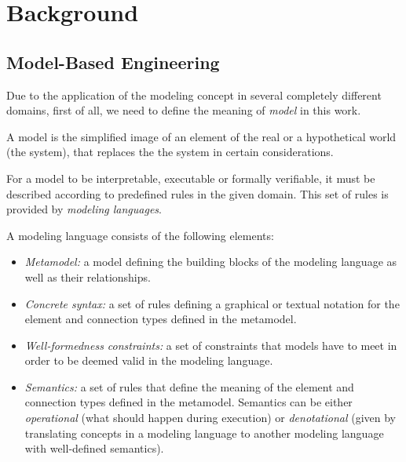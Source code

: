 \chapter{Background}

\section{Model-Based Engineering} \label{sec_backgrmbe}
Due to the application of the modeling concept in several completely different domains, first of all, we need to define the meaning of \textit{model} in this work.
\begin{definition}[Model]
	A model is the simplified image of an element of the real or a hypothetical world (the system), that replaces the the system in certain considerations.
\end{definition}

For a model to be interpretable, executable or formally verifiable, it must be described according to predefined rules in the given domain. This set of rules is provided by \textit{modeling languages}.
\begin{definition}
	A modeling language consists of the following elements:
	\begin{itemize}
		\item \emph{Metamodel:} a model defining the building blocks of the modeling language as well
		as their relationships.
		\item \emph{Concrete syntax:} a set of rules defining a graphical or textual notation for the
		element and connection types defined in the metamodel.
		\item \emph{Well-formedness constraints:} a set of constraints that models have to meet in order
		to be deemed valid in the modeling language.
		\item \emph{Semantics:} a set of rules that define the meaning of the element and connection
		types defined in the metamodel. Semantics can be either \textit{operational} (what should happen during execution) or \textit{denotational} (given by translating concepts in a modeling language to another modeling language with well-defined semantics).
	\end{itemize}
\end{definition}


